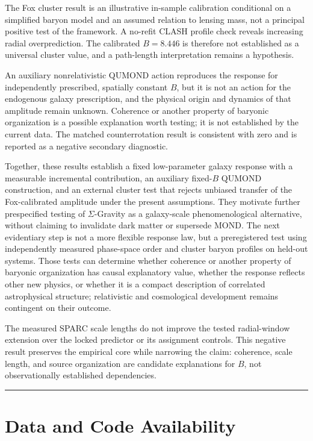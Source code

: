 \documentclass[aps,prd,reprint,superscriptaddress,showpacs,floatfix,longbibliography]{revtex4-2}
\begin{document}
The Fox cluster result is an illustrative in-sample calibration conditional on a simplified baryon model and an assumed relation to lensing mass, not a principal positive test of the framework. A no-refit CLASH profile check reveals increasing radial overprediction. The calibrated $B=8.446$ is therefore not established as a universal cluster value, and a path-length interpretation remains a hypothesis.

An auxiliary nonrelativistic QUMOND action reproduces the response for independently prescribed, spatially constant $B$, but it is not an action for the endogenous galaxy prescription, and the physical origin and dynamics of that amplitude remain unknown. Coherence or another property of baryonic organization is a possible explanation worth testing; it is not established by the current data. The matched counterrotation result is consistent with zero and is reported as a negative secondary diagnostic.

Together, these results establish a fixed low-parameter galaxy response with a measurable incremental contribution, an auxiliary fixed-$B$ QUMOND construction, and an external cluster test that rejects unbiased transfer of the Fox-calibrated amplitude under the present assumptions. They motivate further prespecified testing of $\Sigma$-Gravity as a galaxy-scale phenomenological alternative, without claiming to invalidate dark matter or supersede MOND. The next evidentiary step is not a more flexible response law, but a preregistered test using independently measured phase-space order and cluster baryon profiles on held-out systems. Those tests can determine whether coherence or another property of baryonic organization has causal explanatory value, whether the response reflects other new physics, or whether it is a compact description of correlated astrophysical structure; relativistic and cosmological development remains contingent on their outcome.

The measured SPARC scale lengths do not improve the tested radial-window extension over the locked predictor or its assignment controls. This negative result preserves the empirical core while narrowing the claim: coherence, scale length, and source organization are candidate explanations for $B$, not observationally established dependencies.

\medskip\hrule\medskip

\section{Data and Code Availability}
\end{document}
